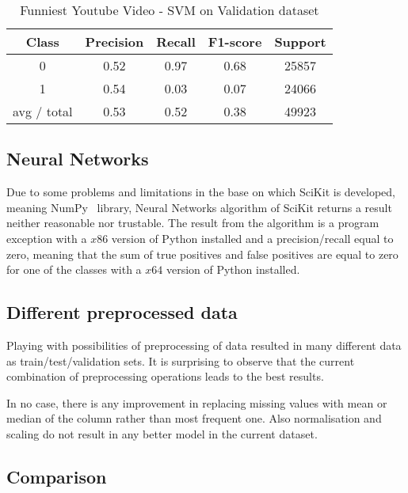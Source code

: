 \begin{table}[p]
\begin{center}
\begin{tabular}{|c|c|c|c|c|}
\hline Class & Precision & Recall & F1-score & Support \\

\hline 0 & 0.52 & 0.97 & 0.68 & 25857\\
\hline 1 & 0.54 & 0.03 & 0.07 & 24066\\
\hline avg / total & 0.53 & 0.52 & 0.38 & 49923\\
\hline
\end{tabular}

\caption{Funniest Youtube Video - SVM on Validation dataset}
\label{table:ds3:svm-test}
\end{center}
\end{table}


\subsection{Neural Networks}

Due to some problems and limitations in the base on which SciKit is developed,
meaning NumPy~\cite{} library, Neural Networks algorithm of SciKit returns
a result neither reasonable nor trustable. The result from the algorithm is a
program exception with a $x86$ version of Python installed and a
precision/recall equal to zero, meaning that the sum of true positives and false
positives are equal to zero for one of the
classes with a $x64$ version of Python installed.


\subsection{Different preprocessed data}

Playing with possibilities of preprocessing of data resulted in many different
data as train/test/validation sets. It is surprising to observe that the current
combination of preprocessing operations leads to the best results. 

In no case, there is any improvement in replacing missing values with mean or
median of the column rather than most frequent one. Also normalisation and
scaling do not result in any better model in the current dataset.

\subsection{Comparison}

